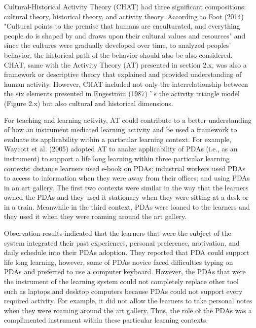 Cultural-Historical Activity Theory (CHAT) had three significant compositions: cultural theory, historical theory, and activity theory. According to Foot (2014) \cite{foot2014cultural} "Cultural points to the premise that humans are enculturated, and everything people do is shaped by and draws upon their cultural values and resources" \cite[pp. 3]{foot2014cultural} and since the cultures were gradually developed over time, to analyzed peoples' behavior, the historical path of the behavior should also be also considered. CHAT, same with the Activity Theory (AT) presented in section 2.x, was also a framework or descriptive theory that explained and provided understanding of human activity. However, CHAT included not only the interrelationship between the six elements presented in Engestr{\"o}m (1987) \cite{engestrom1999perspectives}' s the activity triangle model (Figure 2.x) but also cultural and historical dimensions. 

For teaching and learning activity, AT could contribute to a better understanding of how an instrument mediated learning activity and be used a framework to evaluate its applicability within a particular learning context. For example, Waycott et al. (2005) \cite{waycott2005pdas} adopted AT to analze applicability of PDAs (i.e., as an instrument) to support a life long learning within three particular learning contexts: distance learners used e-book on PDAs; industrial workers used PDAs to access to information when they were away from their offices; and using PDAs in an art gallery. The first two contexts were similar in the way that the learners owned the PDAs and they used it stationary when they were sitting at a desk or in a train. Meanwhile in the third context, PDAs were loaned to the learners and they used it when they were roaming around the art gallery.

Observation results indicated that the learners that were the subject of the system integrated their past experiences, personal preference, motivation, and daily schedule into their PDAs adoption. They reported that PDA could support life long learning, however, some of PDAs novice faced difficulties typing on PDAs and preferred to use a computer keyboard. However, the PDAs that were the instrument of the learning system could not completely replace other tool such as laptops and desktop computers because PDAs could not support every required activity. For example, it did not allow the learners to take personal notes when they were roaming around the art gallery. Thus, the role of the PDAs was a complimented instrument within these particular learning contexts.


